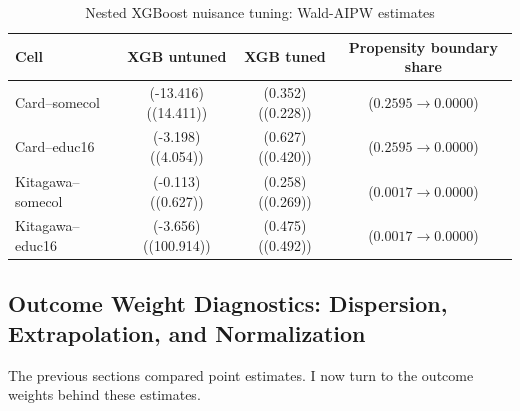 \documentclass[12pt, a4paper, oneside]{article}
\theoremstyle{plain}
\theoremstyle{definition}
\begin{document}
\begin{table}[!htbp]
\centering
\begin{threeparttable}
\caption{Nested XGBoost nuisance tuning: Wald-AIPW estimates}
\label{tab:xgboost_estimates}
\begin{tabular}{lccc}
\toprule
Cell & XGB untuned & XGB tuned & Propensity boundary share \\
\midrule
Card--somecol     & (-13.416) ((14.411))  & (0.352) ((0.228)) & ($0.2595 \rightarrow 0.0000$) \\
Card--educ16      & (-3.198) ((4.054))    & (0.627) ((0.420)) & ($0.2595 \rightarrow 0.0000$) \\
Kitagawa--somecol & (-0.113) ((0.627))    & (0.258) ((0.269)) & ($0.0017 \rightarrow 0.0000$) \\
Kitagawa--educ16  & (-3.656) ((100.914))  & (0.475) ((0.492)) & ($0.0017 \rightarrow 0.0000$) \\
\bottomrule
\end{tabular}
\end{threeparttable}
\end{table}





\subsection{Outcome Weight Diagnostics: Dispersion, Extrapolation, and Normalization}
The previous sections compared point estimates. 
I now turn to the outcome weights behind these estimates. 
\end{document}
